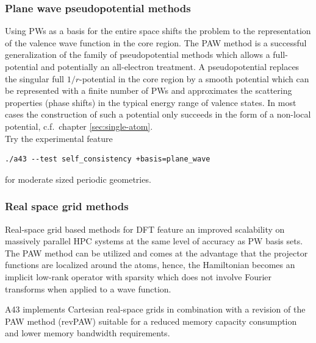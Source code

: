 \documentclass[oribibl]{llncs}
\newcommand{\codename}{A43}
\begin{document}
\subsubsection*{Plane wave pseudopotential methods}
Using \ac{PW}s as a basis for the entire space shifts the problem to the representation of the valence wave function in the core region.
The \ac{PAW} method is a successful generalization of the family of pseudopotential methods which allows a full-potential and potentially an all-electron treatment.
A pseudopotential replaces the singular full $1/r$-potential in the core region
by a smooth potential which can be represented with a finite number of \ac{PW}s
and approximates the scattering properties (phase shifts) in the typical energy
range of valence states.
In most cases the construction of such a potential only succeeds in the form of a non-local potential, c.f.~chapter \ref{sec:single-atom}.
\\
Try the experimental feature
\begin{verbatim}
./a43 --test self_consistency +basis=plane_wave
\end{verbatim}
for moderate sized periodic geometries.

\subsubsection*{Real space grid methods}
Real-space grid based methods for \ac{DFT}
feature an improved scalability on massively parallel \ac{HPC} systems at the same level of accuracy as \ac{PW} basis sets. 
The \ac{PAW} method can be utilized and comes at the advantage that the projector functions are localized around the atoms, 
hence, the Hamiltonian becomes an implicit low-rank operator with sparsity which does not involve Fourier transforms when applied to a wave function.

\codename{} implements Cartesian real-space grids 
in combination with a revision of the \ac{PAW} method (revPAW) suitable for
a reduced memory capacity consumption and lower memory bandwidth requirements.
\end{document}
